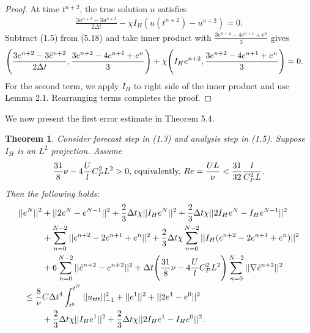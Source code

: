\documentclass[10pt,a4paper]{amsart}
\newtheorem{theorem}{Theorem}[section]
\begin{document}
\begin{proof}
    At time $t^{n+2}$, the true solution $u$ satisfies
    \begin{align}
        \frac{3u^{n+2}-3u^{n+2}}{2\Delta t} -\chi I_H(u(t^{n+2})-u^{n+2})=0.
    \end{align}
    Subtract (1.5) from (5.18) and take inner product with $\frac{3e^{n+2}-4e^{n+1}+e^n}{3}$ gives
    \begin{align}
        \Bigg(\frac{3e^{n+2}-3\Tilde{e}^{n+2}}{2\Delta t}, \frac{3e^{n+2}-4e^{n+1}+e^n}{3}\Bigg)
        &+\chi \Bigg(I_He^{n+2}, \frac{3e^{n+2}-4e^{n+1}+e^n}{3}\Bigg)=0. \notag
    \end{align}
    For the second term, we apply $I_H$ to right side of the inner product and use Lemma 2.1. Rearranging terms completes the proof.
\end{proof}

We now present the first error estimate in Theorem 5.4.

\begin{theorem}
    Consider forecast step in (1.3) and analysis step in (1.5). Suppose $I_H$ is an $L^2$ projection. Assume 
    \begin{align}
        \frac{31}{8}\nu-4\frac{U}{l}C_P^2L^2>0 \text{, equivalently, } Re=\frac{UL}{\nu}<\frac{31}{32}\frac{l}{C_P^2L}. \notag
    \end{align} Then the following holds:
    \begin{align}
        ||e^N||^2
        &+||2e^N-e^{N-1}||^2+\frac{2}{3}\Delta t\chi ||I_He^N||^2+\frac{2}{3}\Delta t\chi ||2I_He^N-I_He^{N-1}||^2 \notag \\
        &+\sum_{n=0}^{N-2}||e^{n+2}-2e^{n+1}+e^n||^2 + \frac{2}{3}\Delta t\chi \sum_{n=0}^{N-2} ||I_H(e^{n+2}-2e^{n+1}+e^n)||^2 \notag \\
        &+ 6 \sum_{n=0}^{N-2} ||\tilde{e}^{n+2}-e^{n+2}||^2 +\Delta t\Bigg(\frac{31}{8}\nu -4\frac{U}{l}C_P^2L^2\Bigg) \sum_{n=0}^{N-2}||\nabla \tilde{e}^{n+2}||^2 \\
        \leq \frac{8}{\nu}&C\Delta t^4\int_{t^0}^{t^{N}}||u_{ttt}||_{-1}^2 + ||e^1||^2+||2e^1-e^0||^2 \notag \\
        &+\frac{2}{3}\Delta t\chi ||I_He^1||^2+\frac{2}{3}\Delta t\chi ||2I_He^1-I_He^0||^2. \notag
    \end{align}
\end{theorem}
\end{document}
